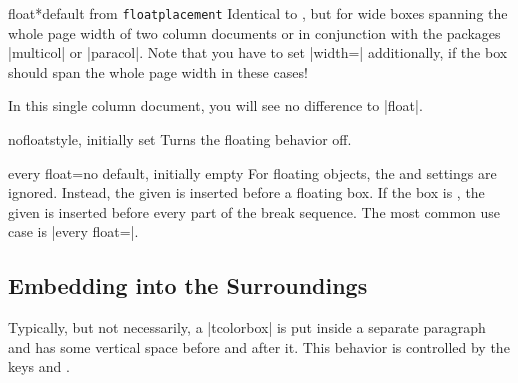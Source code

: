 \begin{docTcbKey}{float*}{}{default from \texttt{floatplacement}}
  Identical to , but for wide boxes spanning the whole page
  width of two column documents or in conjunction with the packages
  |multicol| or |paracol|. Note that you have to set |width=\textwidth|
  additionally, if the box should span the whole page width in these cases!
\begin{dispListing}
\begin{tcolorbox}[float*=b, title=Floating box from |float*|,width=\textwidth,
    enhanced,watermark text={I'm also floating}]
  In this single column document, you will see no difference to |float|.
\end{tcolorbox}
\end{dispListing}
\end{docTcbKey}
{\tcbusetemp}


\begin{docTcbKey}{nofloat}{}{style, initially set}
  Turns the floating behavior off.
\end{docTcbKey}


\begin{docTcbKey}[][doc new=2014-09-19]{every float}{=}{no default, initially empty}
  For floating objects, the  and 
  settings are ignored. Instead, the given  is inserted before
  a floating box. If the box is , the given  is
  inserted before every part of the break sequence.
  The most common use case is |every float=\centering|.

\begin{dispListing}
\end{dispListing}
{\tcbusetemp}

\end{docTcbKey}



\clearpage
\subsection{Embedding into the Surroundings}\label{subsec:surroundings}
Typically, but not necessarily, a |tcolorbox| is put inside a separate paragraph
and has some vertical space before and after it.
This behavior is controlled by the keys  and .

